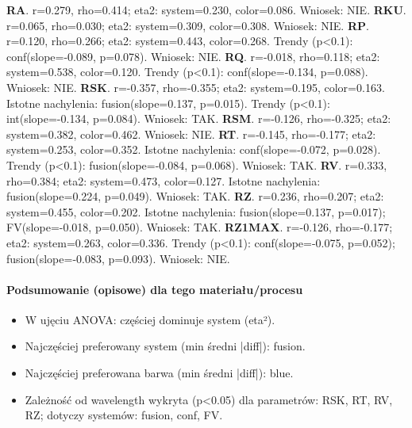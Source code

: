 \documentclass[
  10pt,
]{article}
\begin{document}
\textbf{RA}. r=0.279, rho=0.414; eta2: system=0.230, color=0.086.
Wniosek: NIE. \textbf{RKU}. r=0.065, rho=0.030; eta2: system=0.309,
color=0.308. Wniosek: NIE. \textbf{RP}. r=0.120, rho=0.266; eta2:
system=0.443, color=0.268. Trendy (p\textless0.1): conf(slope=-0.089,
p=0.078). Wniosek: NIE. \textbf{RQ}. r=-0.018, rho=0.118; eta2:
system=0.538, color=0.120. Trendy (p\textless0.1): conf(slope=-0.134,
p=0.088). Wniosek: NIE. \textbf{RSK}. r=-0.357, rho=-0.355; eta2:
system=0.195, color=0.163. Istotne nachylenia: fusion(slope=0.137,
p=0.015). Trendy (p\textless0.1): int(slope=-0.134, p=0.084). Wniosek:
TAK. \textbf{RSM}. r=-0.126, rho=-0.325; eta2: system=0.382,
color=0.462. Wniosek: NIE. \textbf{RT}. r=-0.145, rho=-0.177; eta2:
system=0.253, color=0.352. Istotne nachylenia: conf(slope=-0.072,
p=0.028). Trendy (p\textless0.1): fusion(slope=-0.084, p=0.068).
Wniosek: TAK. \textbf{RV}. r=0.333, rho=0.384; eta2: system=0.473,
color=0.127. Istotne nachylenia: fusion(slope=0.224, p=0.049). Wniosek:
TAK. \textbf{RZ}. r=0.236, rho=0.207; eta2: system=0.455, color=0.202.
Istotne nachylenia: fusion(slope=0.137, p=0.017); FV(slope=-0.018,
p=0.050). Wniosek: TAK. \textbf{RZ1MAX}. r=-0.126, rho=-0.177; eta2:
system=0.263, color=0.336. Trendy (p\textless0.1): conf(slope=-0.075,
p=0.052); fusion(slope=-0.083, p=0.093). Wniosek: NIE.

\paragraph{Podsumowanie (opisowe) dla tego materiału/procesu}
\begin{itemize}
\item W ujęciu ANOVA: częściej dominuje system (eta²).
\item Najczęściej preferowany system (min średni |diff|): fusion.
\item Najczęściej preferowana barwa (min średni |diff|): blue.
\item Zależność od wavelength wykryta (p<0.05) dla parametrów: RSK, RT, RV, RZ; dotyczy systemów: fusion, conf, FV.
\end{itemize}
\end{document}
